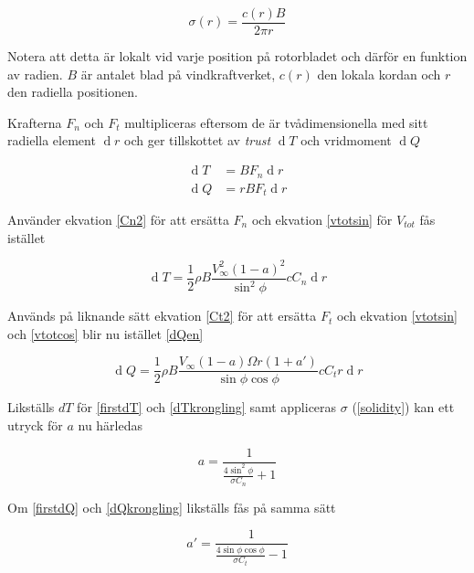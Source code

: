\begin{equation}
\label{solidity}\sigma (r) = \frac{c(r)B}{2 \pi r}
\end{equation}

Notera att detta är lokalt vid varje position på rotorbladet och därför en funktion av radien. $B$ är antalet blad på vindkraftverket, $c(r)$ den lokala kordan och $r$ den radiella positionen.

Krafterna $F_n$ och $F_t$ multipliceras eftersom de är tvådimensionella med sitt radiella element $\operatorname{d}\!r$ och ger tillskottet av \emph{trust} $\operatorname{d}\!T$ och vridmoment $\operatorname{d}\!Q$

\begin{equations}
\begin{align}
    \operatorname{d}\!T &= B F_n \operatorname{d}\!r \\
\label{dQen}\operatorname{d}\!Q &= r B F_t \operatorname{d}\!r
\end{align}
\end{equations}

Använder ekvation \ref{Cn2} för att ersätta $F_n$ och ekvation \ref{vtotsin} för $V_{tot}$ fås istället

\begin{equation}
\label{dTkrongling}\operatorname{d}\!T = \frac{1}{2}\rho B \frac{V_{\infty}^2(1 - a)^2}{\sin^2 \phi} c C_n \operatorname{d}\!r
\end{equation}

Används på liknande sätt ekvation \ref{Ct2} för att ersätta $F_t$ och ekvation \ref{vtotsin} och \ref{vtotcos} blir nu istället \ref{dQen}

\begin{equation}
\label{dQkrongling}\operatorname{d}\!Q = \frac{1}{2}\rho B \frac{V_{\infty} (1 - a) \Omega r (1 + a')}{\sin \phi \cos \phi} c C_t r \operatorname{d}\!r
\end{equation}

Likställs $dT$ för \ref{firstdT} och \ref{dTkrongling} samt appliceras $\sigma$ (\ref{solidity}) kan ett utryck för $a$ nu härledas

\begin{equation}
\label{finala} a = \frac{1}{\frac{4 \sin^2 \phi}{\sigma C_n} + 1}
\end{equation}

Om \ref{firstdQ} och \ref{dQkrongling} likställs fås på samma sätt 

\begin{equation}
\label{finala} a' = \frac{1}{\frac{4 \sin \phi \cos \phi}{\sigma C_t} - 1}
\end{equation}

